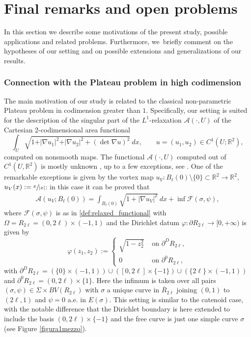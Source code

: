 \documentclass[11pt]{article}
\numberwithin{equation}{section}
\newcommand{\R}{\mathbb{R}}
\let\grad\nabla
\let\Om\Omega
\theoremstyle{definition}
\begin{document}
\section{Final remarks and open problems}
\label{sec:final_comments_and_open_problems}

In this section we describe some motivations of the present study,
possible applications and related problems.
Furthermore, we~briefly comment on the hypotheses of our setting
and on possible extensions and generalizations of our results.

\subsubsection*{Connection with the Plateau problem in high codimension}
The main motivation of our study is related to the classical non-parametric Plateau problem in codimension greater than $1$. Specifically, our setting is suited for the description of the
singular part of the $L^1$-relaxation
$\mathcal A(\cdot, U)$
of the Cartesian 2-codimensional area functional
\begin{equation}
\label{eq:area_smooth_cod_2}
\int_U \sqrt{1 + \vert \grad u_1\vert^2 + \vert \grad u_2\vert^2 +
(\det\grad u)^2} ~dx, \qquad u = (u_1, u_2) \in C^1(U; \R^2),
\end{equation}
computed on nonsmooth maps.
The functional
$\mathcal A(\cdot, U)$
computed
out of $C^1(U, \R^2)$
is mostly unknown \cite{AcDa:94,GiMoSu:98_2}, up to
a few exceptions, see \cite{BePa:10,BeElPaSc:19,Scala:19,vortex}.
One of the remarkable exceptions is given by
the vortex map
$u_V:B_\ell(0) \setminus \{0\}\subset\R^2\to\R^2$,
$u_V(x):=\sfrac{x}{|x|}$:
in this case it can be proved \cite{BES1,BES2,BES3} that
\begin{align}\label{value_vortex}
\mathcal A(u_V; B_\ell(0))
= \int_{B_\ell(0)}\sqrt{1+|\nabla u_V|^2}~dx+\inf\mathcal F(\sigma,\psi),
\end{align}
where $\mathcal F(\sigma,\psi)$ is as in \eqref{def:relaxed_functional} with
$\Om=R_{2\ell}=(0,2\ell)\times(-1,1)$ and the
Dirichlet datum $\varphi :\partial R_{2\ell}\to [0,+\infty)$
is given by
\begin{equation}\label{vortex}
\varphi(z_1,z_2):=\begin{cases}
\sqrt{1-z_2^2}&\text{ on }\partial^DR_{2\ell},\\
0& \text{ on }\partial^0R_{2\ell},
\end{cases}
\end{equation}
with $\partial^DR_{2\ell}=(\{0\}\times (-1,1))\cup ([0,2\ell]\times \{-1\})\cup (\{2\ell\}\times (-1,1))$
and $\partial^0R_{2\ell}=(0,2\ell)\times \{1\}$.
Here the infimum is taken over all pairs $(\sigma,\psi)\in \Sigma\times BV(R_{2\ell})$ with $\sigma$ a unique curve in $\overline R_{2\ell}$ joining $(0,1)$ to $(2\ell,1)$
and $\psi=0$ a.e. in $E(\sigma)$.
This setting is similar to the catenoid case,
with the notable difference that the Dirichlet boundary is here extended to include the basis $(0,2\ell)\times \{-1\}$ and the free curve
is just one simple curve $\sigma$
(see Figure \ref{figura1mezzo}).
\end{document}

